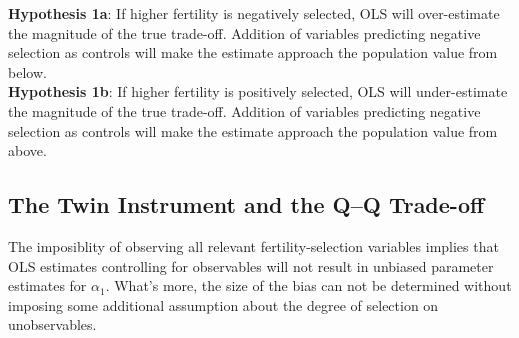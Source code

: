 \documentclass[subeqn]{article}
\begin{document}
\begin{spacing}{1.4}
\noindent %
\textbf{Hypothesis 1a}: If higher fertility is negatively selected, OLS will over-estimate the magnitude of the true trade-off. Addition of variables predicting negative selection as controls will make the estimate approach the population value from below.\\
\textbf{Hypothesis 1b}: If higher fertility is positively selected, OLS will under-estimate the magnitude of the true trade-off. Addition of variables predicting negative selection as controls will make the estimate approach the population value from above.


\subsection{The Twin Instrument and the Q--Q Trade-off}
\label{sscn:validIV}
The imposiblity of observing all relevant fertility-selection variables
implies that OLS estimates controlling for observables will not result
in unbiased parameter estimates for $\alpha_1$.  What's more, the size
of the bias can not be determined without imposing some additional
assumption about the degree of selection on unobservables.


\end{spacing}
\end{document}
